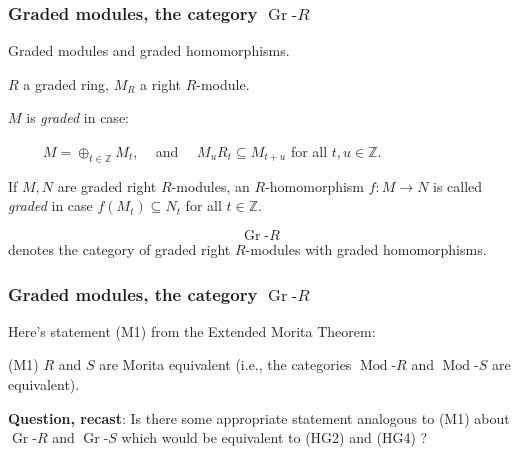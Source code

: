 \documentclass{beamer}
\newcommand{\rmod}[1]{\operatorname{Mod}\text{-}#1}
\newcommand{\grmod}[1]{\operatorname{Gr}\text{-}#1}
\begin{document}
\begin{frame}
\frametitle{Graded modules, the category $\grmod{R}$}




\hspace{.5in}Graded modules and graded homomorphisms.

\bigskip


$R$ a graded ring,  $M_R$ a right $R$-module.   

\medskip

$M$ is {\it graded} in case:

\medskip



\ \ \ \ \ $M = \oplus_{t \in \mathbb{Z}} M_t$,  \ \ and \ \  $ M_u R_t \subseteq M_{t+u}$ for all $t, u \in \mathbb{Z}$. 

\bigskip

If $M, N$ are graded right $R$-modules,  an $R$-homomorphism $f: M \to N$ is called {\it graded} in case $f(M_t) \subseteq N_t$ for all $t\in \mathbb{Z}$.  



$$\grmod{R}$$
 denotes the category of graded right  $R$-modules with graded homomorphisms.  


\end{frame}

\begin{frame}
\frametitle{Graded modules, the category $\grmod{R}$}


Here's statement (M1) from the Extended Morita Theorem:

\medskip


(M1)    $R$ and $S$ are Morita equivalent (i.e., the categories $\rmod{R}$ and $\rmod{S}$ are equivalent). 


\bigskip

{\bf Question, recast}:  Is there some appropriate statement analogous to (M1)  about $\grmod{R}$ and $\grmod{S}$ which would be equivalent to (HG2) and (HG4) ?





\end{frame}
\end{document}
